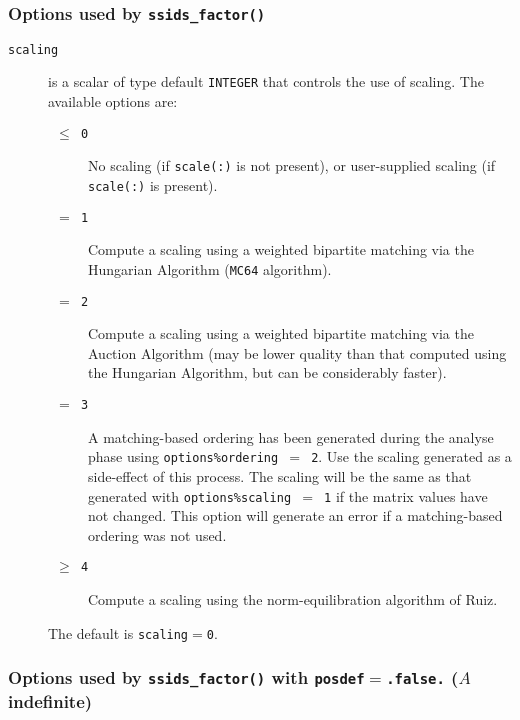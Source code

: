 \subsubsection*{Options used by {\tt ssids\_factor()}}
\begin{description}
\item[\texttt{scaling}] is a scalar of type default {\tt INTEGER} that controls
   the use of scaling. The available
options are:
\begin{description}
   \item[\texttt{ $\le$ 0 }] No scaling (if \texttt{scale(:)} is not present),
      or user-supplied scaling (if \texttt{scale(:)} is present).
   \item[\texttt{ $=$ 1 }] Compute a scaling using a weighted bipartite matching
      via the Hungarian Algorithm (\texttt{MC64} algorithm).
   \item[\texttt{ $=$ 2 }] Compute a scaling using a weighted bipartite matching
      via the Auction Algorithm (may be lower quality than that computed using 
      the Hungarian Algorithm, but can be considerably faster).
   \item[\texttt{ $=$ 3 }] A matching-based ordering has been generated during the
      analyse phase using {\tt options\%ordering $=$ 2}. Use the
      scaling generated as a side-effect of this process. The scaling will be
      the same as that generated with {\tt options\%scaling $=$ 1} if the matrix
      values have not changed. This option will generate an error if a
      matching-based ordering was not used.
   \item[\texttt{ $\ge$ 4 }] Compute a scaling using the norm-equilibration
      algorithm of Ruiz.
\end{description}
The default is {\tt scaling}$=${\tt 0}.

\end{description}

\subsubsection*{Options used by {\tt ssids\_factor()} with
{\tt posdef}$ =${\tt .false.}  ($A$ indefinite)}

